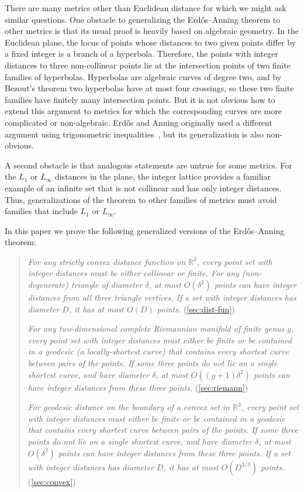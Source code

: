 \documentclass[11pt]{article}
\theoremstyle{definition}
\begin{document}
There are many metrics other than Euclidean distance for which we might ask similar questions. One obstacle to generalizing the Erd\H{o}s--Anning theorem to other metrics is that its usual proof is heavily based on algebraic geometry. In the Euclidean plane, the locus of points whose distances to two given points differ by a fixed integer is a branch of a hyperbola. Therefore, the points with integer distances to three non-collinear points lie at the intersection points of two finite families of hyperbolas. Hyperbolas are algebraic curves of degree two, and by Bezout's theorem two hyperbolas have at most four crossings, so these two finite families have finitely many intersection points. But it is not obvious how to extend this argument to metrics for which the corresponding curves are more complicated or non-algebraic. Erd\H{o}s and Anning originally used a different argument using trigonometric inequalities~\cite{AnnErd-BAMS-45}, but its generalization is also non-obvious.

A second obstacle is that analogous statements are untrue for some metrics. For the $L_1$ or $L_\infty$ distances in the plane, the integer lattice provides a familiar example of an infinite set that is not collinear and has only integer distances. Thus, generalizations of the theorem to other families of metrics must avoid families that include $L_1$ or $L_\infty$.

In this paper we prove the following generalized versions of the Erd\H{o}s--Anning theorem:

\begin{quotation}
\noindent\textit{For any strictly convex distance function on $\mathbb{R}^2$, every point set with integer distances must be either collinear or finite. For any (non-degenerate) triangle of diameter $\delta$, at most $O(\delta^2)$ points can have integer distances from all three triangle vertices. If a set with integer distances has diameter $D$, it has at most $O(D)$ points.} (\cref{sec:dist-fun})

\smallskip
\noindent\textit{For any two-dimensional complete Riemannian manifold of finite genus $g$, every point set with integer distances must either be finite or be contained in a geodesic (a locally-shortest curve) that contains every shortest curve between pairs of the points. If some three points do not lie on a single shortest curve, and have diameter $\delta$, at most $O((g+1)\delta^2)$ points can have integer distances from these three points.} (\cref{sec:riemann})

\smallskip
\noindent\textit{For geodesic distance on the boundary of a convex set in $\mathbb{R}^3$, every point set with integer distances must either be finite or be contained in a geodesic that contains every shortest curve between pairs of the points. If some three points do not lie on a single shortest curve, and have diameter $\delta$, at most $O(\delta^2)$ points can have integer distances from these three points. If a set with integer distances has diameter $D$, it has at most $O(D^{4/3})$ points.} (\cref{sec:convex})
\end{quotation}
\end{document}
